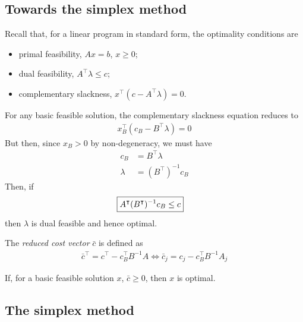 \documentclass{../template/note}
\begin{document}
    \subsection{Towards the simplex method}

    Recall that, for a linear program in standard form, the optimality conditions are
    \begin{itemize}
        \item primal feasibility, $Ax = b$, $x \geq 0$;
        \item dual feasibility, $A^\intercal \lambda \leq c$;
        \item complementary slackness, $x^\intercal (c-A^\intercal \lambda) = 0$.
    \end{itemize}
    For any basic feasible solution, the complementary slackness equation reduces to
    \begin{align*}
        x_B^\intercal (c_B-B^\intercal \lambda) = 0
    \end{align*}
    But then, since $x_B > 0$ by non-degeneracy, we must have
    \begin{align*}
        c_B &= B^\intercal \lambda \\
        \lambda &= (B^\intercal)^{-1} c_B
    \end{align*}
    Then, if
    \begin{align*}
        \Aboxed{A^\intercal (B^\intercal)^{-1} c_B \leq c}
    \end{align*}
    then $\lambda$ is dual feasible and hence optimal.
    
    \begin{definition}
        The \emph{reduced cost vector} $\bar c$ is defined as
        \begin{align*}
            \bar c^\intercal = c^\intercal - c_B^\intercal B^{-1} A \iff \bar c_j = c_j - c_B^\intercal B^{-1} A_j
        \end{align*}
    \end{definition}
    
    If, for a basic feasible solution $x$, $\bar c \geq 0$, then $x$ is optimal.

    \subsection{The simplex method}
\end{document}

